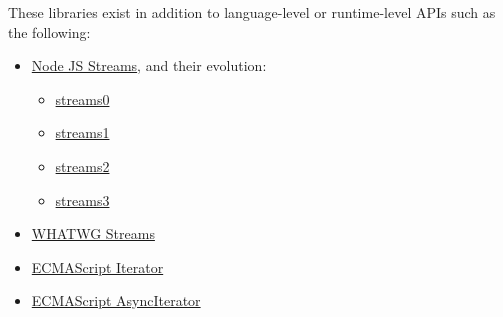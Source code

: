 \documentclass[sigplan,screen,10pt,anonymous,review]{acmart}
\begin{document}
These libraries exist in addition to language-level or runtime-level APIs such as the following:

\begin{itemize}
    \item \href{https://nodejs.org/api/stream.html}{Node JS Streams}, and their evolution: \begin{itemize}
        \item \href{https://nodejs.org/docs/v0.1.100/api.html}{streams0}
        \item \href{https://nodejs.org/docs/v0.4.0/api/streams.html}{streams1}
        \item \href{https://nodejs.org/docs/v0.10.0/api/stream.html}{streams2}
        \item \href{https://nodejs.org/docs/v0.11.5/api/stream.html}{streams3}
    \end{itemize}
    \item \href{https://streams.spec.whatwg.org/}{WHATWG Streams}
    \item \href{https://tc39.es/ecma262/multipage/control-abstraction-objects.html#sec-%iteratorprototype%-object}{ECMAScript Iterator}
    \item \href{https://tc39.es/ecma262/multipage/control-abstraction-objects.html#sec-asynciteratorprototype}{ECMAScript AsyncIterator}
\end{itemize}



\end{document}
